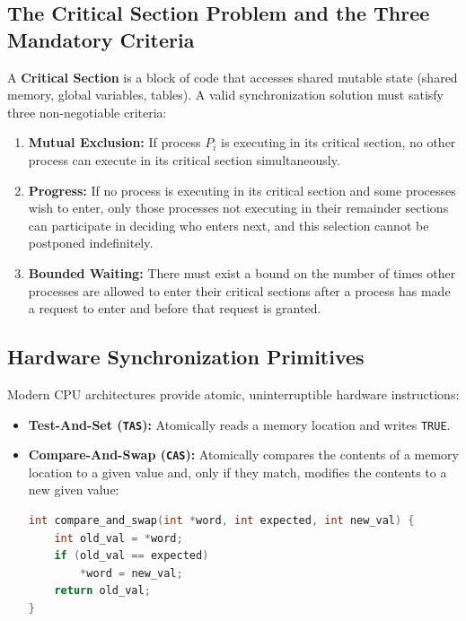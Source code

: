 \subsection{The Critical Section Problem and the Three Mandatory Criteria}
A \textbf{Critical Section} is a block of code that accesses shared mutable state (shared memory, global variables, tables). A valid synchronization solution must satisfy three non-negotiable criteria:
\begin{enumerate}
    \item \textbf{Mutual Exclusion:} If process $P_i$ is executing in its critical section, no other process can execute in its critical section simultaneously.
    \item \textbf{Progress:} If no process is executing in its critical section and some processes wish to enter, only those processes not executing in their remainder sections can participate in deciding who enters next, and this selection cannot be postponed indefinitely.
    \item \textbf{Bounded Waiting:} There must exist a bound on the number of times other processes are allowed to enter their critical sections after a process has made a request to enter and before that request is granted.
\end{enumerate}

\subsection{Hardware Synchronization Primitives}
Modern CPU architectures provide atomic, uninterruptible hardware instructions:
\begin{itemize}
    \item \textbf{Test-And-Set (\texttt{TAS}):} Atomically reads a memory location and writes \texttt{TRUE}.
    \item \textbf{Compare-And-Swap (\texttt{CAS}):} Atomically compares the contents of a memory location to a given value and, only if they match, modifies the contents to a new given value:
\begin{lstlisting}[language=C]
int compare_and_swap(int *word, int expected, int new_val) {
    int old_val = *word;
    if (old_val == expected)
        *word = new_val;
    return old_val;
}
\end{lstlisting}
\end{itemize}

